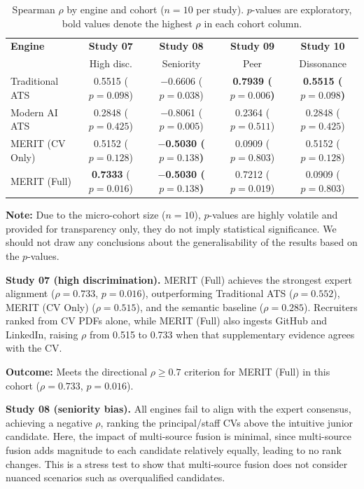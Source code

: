 \begin{table}[htbp]
    \centering
    \caption[Spearman $\rho$ across Studies 07--10]{Spearman $\rho$ by engine and cohort ($n=10$ per study). $p$-values are exploratory, bold values denote the highest $\rho$ in each cohort column.}
    \label{tab:spearman-studies-combined}
    \small
    \setlength{\tabcolsep}{4pt}
    \begin{tabular}{l c c c c}
        \toprule
        \textbf{Engine} &
        \textbf{Study 07} &
        \textbf{Study 08} &
        \textbf{Study 09} &
        \textbf{Study 10} \\
        & High disc. & Seniority & Peer & Dissonance \\
        \midrule
        Traditional ATS & 0.5515 ($p{=}0.098$) & $-$0.6606 ($p{=}0.038$) & \textbf{0.7939 ($p{=}0.006$)} & \textbf{0.5515 ($p{=}0.098$)} \\
        Modern AI ATS   & 0.2848 ($p{=}0.425$) & $-$0.8061 ($p{=}0.005$) & 0.2364 ($p{=}0.511$) & 0.2848 ($p{=}0.425$) \\
        MERIT (CV Only) & 0.5152 ($p{=}0.128$) & \textbf{$-$0.5030 ($p{=}0.138$)} & 0.0909 ($p{=}0.803$) & 0.5152 ($p{=}0.128$) \\
        MERIT (Full)    & \textbf{0.7333} ($p{=}0.016$) & \textbf{$-$0.5030 ($p{=}0.138$)} & 0.7212 ($p{=}0.019$) & 0.0909 ($p{=}0.803$) \\
        \bottomrule
    \end{tabular}
\end{table}

\textbf{Note:} Due to the micro-cohort size ($n=10$), $p$-values are highly volatile and provided for transparency only,  
they do not imply statistical significance. We should not draw any conclusions about the generalisability of the results based on the $p$-values.

\textbf{Study 07 (high discrimination).}
MERIT (Full) achieves the strongest expert alignment ($\rho=0.733$, $p=0.016$), outperforming Traditional ATS ($\rho=0.552$),
MERIT (CV Only) ($\rho=0.515$), and the semantic baseline ($\rho=0.285$).
Recruiters ranked from CV PDFs alone, while MERIT (Full) also ingests GitHub and LinkedIn, raising $\rho$ from 0.515 to 0.733 
when that supplementary evidence agrees with the CV.

\textbf{Outcome:} Meets the directional $\rho \geq 0.7$ criterion for MERIT (Full) in this cohort ($\rho = 0.733$, $p = 0.016$).

\textbf{Study 08 (seniority bias).}
\label{subsec:study-08-spearman-seniority}
All engines fail to align with the expert consensus, achieving a negative $\rho$, ranking the principal/staff CVs above 
the intuitive junior candidate. Here, the impact of multi-source fusion is minimal, since multi-source fusion adds 
magnitude to each candidate relatively equally, leading to no rank changes. This is a stress test to show that 
multi-source fusion does not consider nuanced scenarios such as overqualified candidates.

